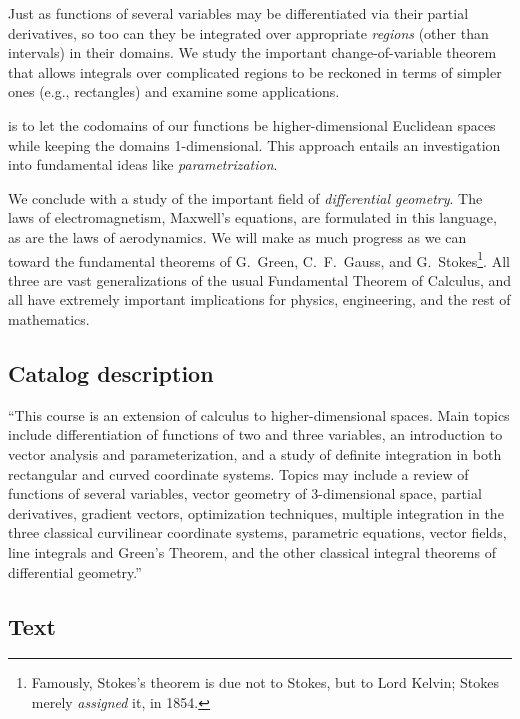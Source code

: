 \documentclass[symmetric]{tufte-handout}
\begin{document}
    Just as functions of several variables may be differentiated 
    via their partial derivatives, so too can they be integrated over
    appropriate \emph{regions} (other than intervals) in their domains. We
    study the important change-of-variable  theorem that allows integrals over
    complicated regions to be reckoned in terms of simpler ones (e.g.,
    rectangles) and examine some applications.

     is to let the codomains of our functions be
    higher-dimensional Euclidean spaces while keeping the domains 1-dimensional.
    This approach entails an investigation into fundamental ideas like
    \emph{parametrization}.

    We conclude with a study of the important field of \emph{differential
    geometry}. The laws of electromagnetism, Maxwell's equations, are formulated
    in this language, as are the laws of aerodynamics. We will make as much
    progress as we can toward the fundamental theorems of G.\ Green, C.\ F.\
    Gauss, and G.\ Stokes\footnote{Famously, Stokes's theorem is due not to
    Stokes, but to Lord Kelvin; Stokes merely \emph{assigned} it, in 1854.}. All
    three are vast generalizations of the usual Fundamental Theorem of Calculus,
    and all have extremely important implications for physics, engineering, and
    the rest of mathematics.

\subsection{Catalog description}

    ``This course is an extension of calculus to higher-dimensional spaces.
    Main topics include differentiation of functions of two and three
    variables, an introduction to vector analysis and parameterization, and
    a study of definite integration in both rectangular and curved
    coordinate systems. Topics may include a review of functions of several
    variables, vector geometry of 3-dimensional space, partial derivatives,
    gradient vectors, optimization techniques, multiple integration in the
    three classical curvilinear coordinate systems, parametric equations,
    vector fields, line integrals and Green's Theorem, and the other
    classical integral theorems of differential geometry.''

\subsection{Text}
\end{document}
